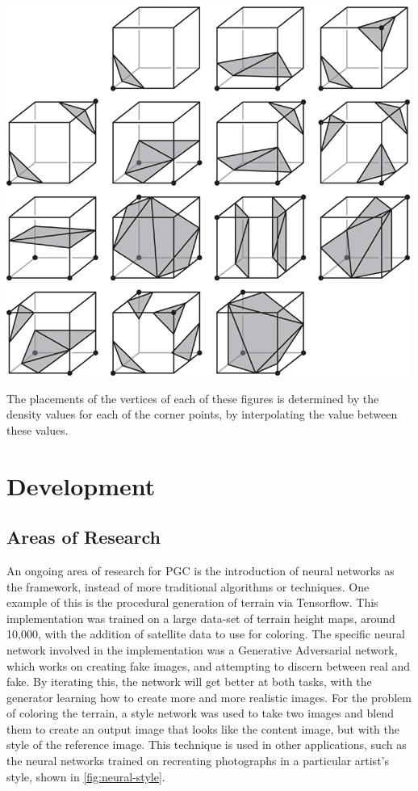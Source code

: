 \documentclass[10pt]{report}
\begin{document}
		\begin{minipage}{\textwidth}
			\centering
			\includegraphics[scale=0.75]{01fig04}
			\label{fig:01fig04}
		\end{minipage}
	
		The placements of the vertices of each of these figures is determined by the density values for each of the corner points, by interpolating the value between these values.
		
	\vspace{10pt}
	\let\clearpage\relax
	\chapter{Development}

		\section{Areas of Research}
	
		An ongoing area of research for PGC is the introduction of neural networks as the framework, instead of more traditional algorithms or techniques. One example of this is the procedural generation of terrain via Tensorflow. This implementation was trained on a large data-set of terrain height maps, around 10,000, with the addition of satellite data to use for coloring. The specific neural network involved in the implementation was a Generative Adversarial network, which works on creating fake images, and attempting to discern between real and fake. By iterating this, the network will get better at both tasks, with the generator learning how to create more and more realistic images. For the problem of coloring the terrain, a style network was used to take two images and blend them to create an output image that looks like the content image, but with the style of the reference image. This technique is used in other applications, such as the neural networks trained on recreating photographs in a particular artist's style, shown in \autoref{fig:neural-style}. 
		
\end{document}
